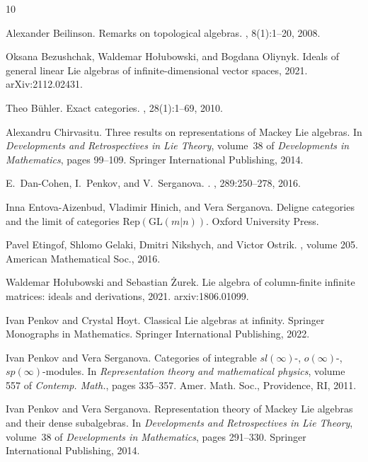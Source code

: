 \documentclass[12pt,reqno]{amsart}
\theoremstyle{definition}
\theoremstyle{remark}
\begin{document}
	
	
	
	
	
    \begin{thebibliography}{10}

Alexander Beilinson.
\newblock Remarks on topological algebras.
, 8(1):1--20, 2008.

Oksana Bezushchak, Waldemar Hołubowski, and Bogdana Oliynyk.
\newblock Ideals of general linear {L}ie algebras of infinite-dimensional
  vector spaces, 2021.
\newblock arXiv:2112.02431.

Theo Bühler.
\newblock Exact categories.
, 28(1):1--69, 2010.

Alexandru Chirvasitu.
\newblock Three results on representations of {M}ackey {L}ie algebras.
\newblock In {\em Developments and Retrospectives in Lie Theory}, volume~38 of
  {\em Developments in Mathematics}, pages 99--109. Springer International
  Publishing, 2014.

E.~{Dan-Cohen}, I.~{Penkov}, and V.~{Serganova}.
.
, 289:250--278, 2016.

Inna Entova-Aizenbud, Vladimir Hinich, and Vera Serganova.
\newblock Deligne categories and the limit of categories
  $\mathrm{Rep}(\mathrm{GL}(m|n))$.
\newblock Oxford University Press.

Pavel Etingof, Shlomo Gelaki, Dmitri Nikshych, and Victor Ostrik.
, volume 205.
\newblock American Mathematical Soc., 2016.

Waldemar Hołubowski and Sebastian Żurek.
\newblock Lie algebra of column-finite infinite matrices: ideals and
  derivations, 2021.
\newblock arxiv:1806.01099.

Ivan Penkov and Crystal Hoyt.
\newblock Classical {L}ie algebras at infinity.
\newblock Springer Monographs in Mathematics. Springer International
  Publishing, 2022.

Ivan Penkov and Vera Serganova.
\newblock Categories of integrable {$sl(\infty)$}-, {$o(\infty)$}-,
  {$sp(\infty)$}-modules.
\newblock In {\em Representation theory and mathematical physics}, volume 557
  of {\em Contemp. Math.}, pages 335--357. Amer. Math. Soc., Providence, RI,
  2011.

Ivan Penkov and Vera Serganova.
\newblock Representation theory of {M}ackey {L}ie algebras and their dense
  subalgebras.
\newblock In {\em Developments and Retrospectives in Lie Theory}, volume~38 of
  {\em Developments in Mathematics}, pages 291--330. Springer International
  Publishing, 2014.


\end{thebibliography}
\end{document}
